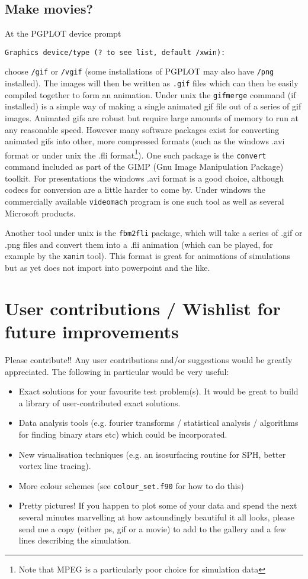 \documentclass[a4paper,12pt]{article}
\begin{document}
\subsection{Make movies?}
 At the PGPLOT device prompt
\begin{verbatim}
Graphics device/type (? to see list, default /xwin):
\end{verbatim}
choose \verb+/gif+ or \verb+/vgif+ (some installations of PGPLOT may also have \verb+/png+
installed). The images will then be written as \verb+.gif+ files which can then be easily compiled
together to form an animation. Under unix the \verb+gifmerge+ command (if installed) is a simple way
of making a single animated gif file out of a series of gif images. Animated gifs are robust but
require large amounts of memory to run at any reasonable speed. However many software packages exist
for converting animated gifs into other, more compressed formats (such as the windows .avi format or
under unix the .fli format\footnote{Note that MPEG is a particularly poor choice for simulation data}). One such package is the
\verb+convert+ command included as part of the GIMP (Gnu Image Manipulation Package) toolkit.
For presentations the windows .avi format is a good choice, although codecs for conversion are a
little harder to come by. Under windows the commercially available \verb+videomach+ program is one
such tool as well as several Microsoft products.

 Another tool under unix is the \verb+fbm2fli+ package, which will take a series of .gif or .png files and
convert them into a .fli animation (which can be played, for example by the \verb+xanim+ tool). This
format is great for animations of simulations but as yet does not import into powerpoint and the like.

\section{User contributions / Wishlist for future improvements}
 Please contribute!! Any user contributions and/or suggestions would be greatly
appreciated. The following in particular would be very useful:

\begin{itemize}
\item Exact solutions for your favourite test problem(s). It would be great to
build a library of user-contributed exact solutions.
\item Data analysis tools (e.g. fourier transforms / statistical analysis /
algorithms for finding binary stars etc) which could be incorporated.
\item New visualisation techniques (e.g. an isosurfacing routine for SPH, better
vortex line tracing).
\item More colour schemes (see \verb+colour_set.f90+ for how to do this)
\item Pretty pictures! If you happen to plot some of your data and spend the
next several minutes marvelling at how astoundingly beautiful it all looks, please send
me a copy (either ps, gif or a movie) to add to the gallery and a few lines
describing the simulation.
\end{itemize}
\end{document}
